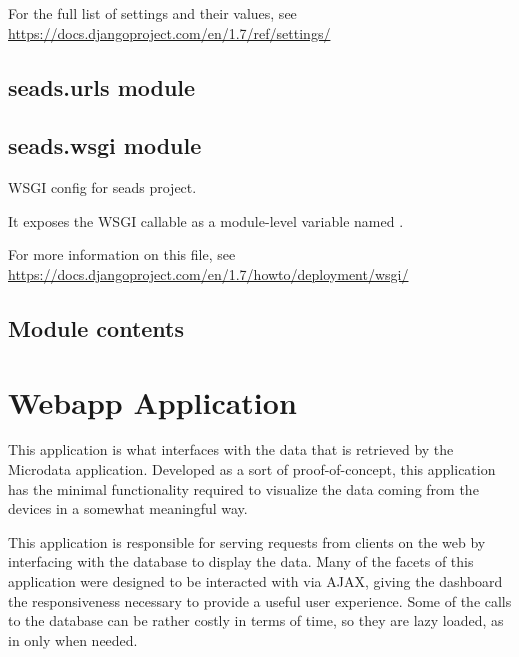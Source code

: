 \documentclass[letterpaper,10pt,english]{sphinxmanual}
\begin{document}
For the full list of settings and their values, see
\href{https://docs.djangoproject.com/en/1.7/ref/settings/}{https://docs.djangoproject.com/en/1.7/ref/settings/}


\subsection{seads.urls module}
\label{modules/seads:seads-urls-module}\label{modules/seads:module-seads.urls}

\subsection{seads.wsgi module}
\label{modules/seads:module-seads.wsgi}\label{modules/seads:seads-wsgi-module}
WSGI config for seads project.

It exposes the WSGI callable as a module-level variable named .

For more information on this file, see
\href{https://docs.djangoproject.com/en/1.7/howto/deployment/wsgi/}{https://docs.djangoproject.com/en/1.7/howto/deployment/wsgi/}


\subsection{Module contents}
\label{modules/seads:module-seads}\label{modules/seads:module-contents}

\section{Webapp Application}
\label{modules/webapp:webapp-application}\label{modules/webapp::doc}
This application is what interfaces with the data that is retrieved by the Microdata application. Developed as a sort of proof-of-concept, this application has the minimal functionality required to visualize the data coming from the devices in a somewhat meaningful way.

This application is responsible for serving requests from clients on the web by interfacing with the database to display the data. Many of the facets of this application were designed to be interacted with via AJAX, giving the dashboard the responsiveness necessary to provide a useful user experience. Some of the calls to the database can be rather costly in terms of time, so they are lazy loaded, as in only when needed.
\end{document}
